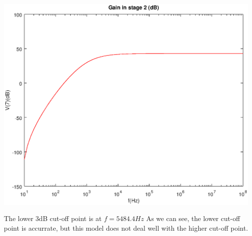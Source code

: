 \includegraphics[width=1\linewidth]{vo2.eps}

The lower 3dB cut-off point is at $f=5484.4 Hz$
As we can see, the lower cut-off point is accurrate, but this model does not deal well with the higher cut-off point.
